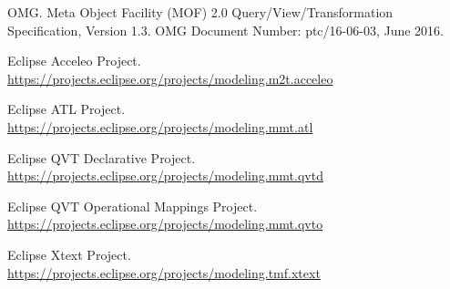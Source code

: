 \documentclass{llncs}
\begin{document}
\begin{thebibliography}{}
OMG. Meta Object Facility (MOF) 2.0 Query/View/Transformation Specification, Version 1.3.
OMG Document Number: ptc/16-06-03, June 2016.

Eclipse Acceleo Project.\\
\url{https://projects.eclipse.org/projects/modeling.m2t.acceleo}

Eclipse ATL Project.\\
\url{https://projects.eclipse.org/projects/modeling.mmt.atl}

Eclipse QVT Declarative Project.\\
\url{https://projects.eclipse.org/projects/modeling.mmt.qvtd}

Eclipse QVT Operational Mappings Project.\\
\url{https://projects.eclipse.org/projects/modeling.mmt.qvto}

Eclipse Xtext Project.\\
\url{https://projects.eclipse.org/projects/modeling.tmf.xtext}

\end{thebibliography}
\end{document}
